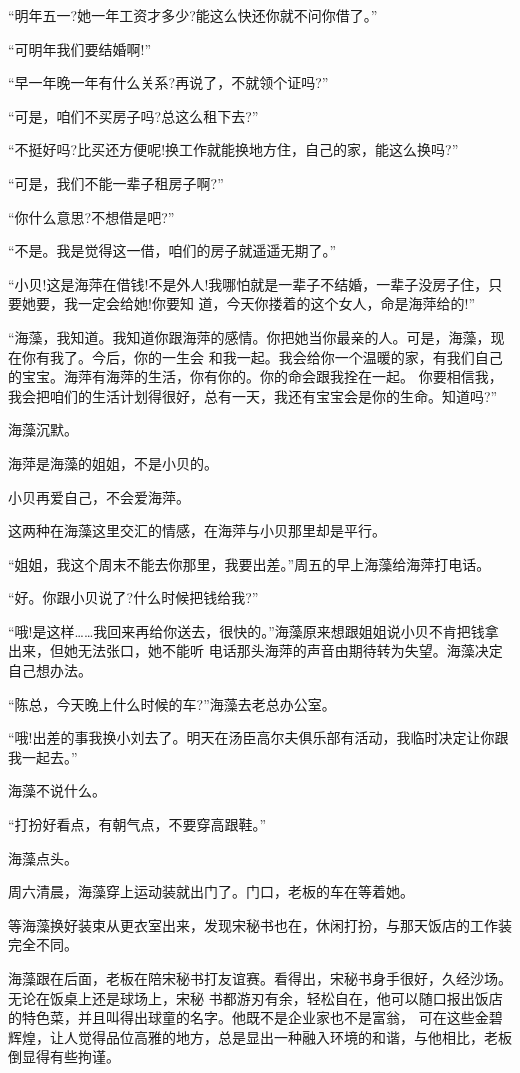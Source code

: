\documentclass[11pt,a4paper,onecolumn]{article}
\begin{document}
``明年五一?她一年工资才多少?能这么快还你就不问你借了。''

``可明年我们要结婚啊!''

``早一年晚一年有什么关系?再说了，不就领个证吗?''

``可是，咱们不买房子吗?总这么租下去?''

``不挺好吗?比买还方便呢!换工作就能换地方住，自己的家，能这么换吗?''

``可是，我们不能一辈子租房子啊?''

``你什么意思?不想借是吧?''

``不是。我是觉得这一借，咱们的房子就遥遥无期了。''

``小贝!这是海萍在借钱!不是外人!我哪怕就是一辈子不结婚，一辈子没房子住，只要她要，我一定会给她!你要知
道，今天你搂着的这个女人，命是海萍给的!''

``海藻，我知道。我知道你跟海萍的感情。你把她当你最亲的人。可是，海藻，现在你有我了。今后，你的一生会
和我一起。我会给你一个温暖的家，有我们自己的宝宝。海萍有海萍的生活，你有你的。你的命会跟我拴在一起。
你要相信我，我会把咱们的生活计划得很好，总有一天，我还有宝宝会是你的生命。知道吗?''

海藻沉默。

海萍是海藻的姐姐，不是小贝的。

小贝再爱自己，不会爱海萍。

这两种在海藻这里交汇的情感，在海萍与小贝那里却是平行。

``姐姐，我这个周末不能去你那里，我要出差。''周五的早上海藻给海萍打电话。

``好。你跟小贝说了?什么时候把钱给我?''

``哦!是这样……我回来再给你送去，很快的。''海藻原来想跟姐姐说小贝不肯把钱拿出来，但她无法张口，她不能听
电话那头海萍的声音由期待转为失望。海藻决定自己想办法。

``陈总，今天晚上什么时候的车?''海藻去老总办公室。

``哦!出差的事我换小刘去了。明天在汤臣高尔夫俱乐部有活动，我临时决定让你跟我一起去。''

海藻不说什么。

``打扮好看点，有朝气点，不要穿高跟鞋。''

海藻点头。

周六清晨，海藻穿上运动装就出门了。门口，老板的车在等着她。

等海藻换好装束从更衣室出来，发现宋秘书也在，休闲打扮，与那天饭店的工作装完全不同。

海藻跟在后面，老板在陪宋秘书打友谊赛。看得出，宋秘书身手很好，久经沙场。无论在饭桌上还是球场上，宋秘
书都游刃有余，轻松自在，他可以随口报出饭店的特色菜，并且叫得出球童的名字。他既不是企业家也不是富翁，
可在这些金碧辉煌，让人觉得品位高雅的地方，总是显出一种融入环境的和谐，与他相比，老板倒显得有些拘谨。
\end{document}
